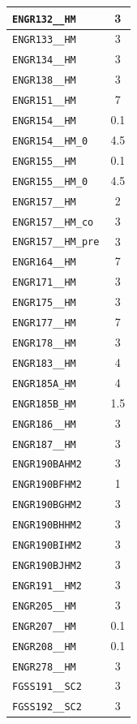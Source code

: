 \begin{longtable}{|p{}|c|}
    \verb|ENGR132__HM| & 3\\\hline
    \verb|ENGR133__HM| & 3\\\hline
    \verb|ENGR134__HM| & 3\\\hline
    \verb|ENGR138__HM| & 3\\\hline
    \verb|ENGR151__HM| & 7\\\hline
    \verb|ENGR154__HM| & 0.1\\\hline
    \verb|ENGR154__HM_0| & 4.5\\\hline
    \verb|ENGR155__HM| & 0.1\\\hline
    \verb|ENGR155__HM_0| & 4.5\\\hline
    \verb|ENGR157__HM| & 2\\\hline
    \verb|ENGR157__HM_co| & 3\\\hline
    \verb|ENGR157__HM_pre| & 3\\\hline
    \verb|ENGR164__HM| & 7\\\hline
    \verb|ENGR171__HM| & 3\\\hline
    \verb|ENGR175__HM| & 3\\\hline
    \verb|ENGR177__HM| & 7\\\hline
    \verb|ENGR178__HM| & 3\\\hline
    \verb|ENGR183__HM| & 4\\\hline
    \verb|ENGR185A_HM| & 4\\\hline
    \verb|ENGR185B_HM| & 1.5\\\hline
    \verb|ENGR186__HM| & 3\\\hline
    \verb|ENGR187__HM| & 3\\\hline
    \verb|ENGR190BAHM2| & 3\\\hline
    \verb|ENGR190BFHM2| & 1\\\hline
    \verb|ENGR190BGHM2| & 3\\\hline
    \verb|ENGR190BHHM2| & 3\\\hline
    \verb|ENGR190BIHM2| & 3\\\hline
    \verb|ENGR190BJHM2| & 3\\\hline
    \verb|ENGR191__HM2| & 3\\\hline
    \verb|ENGR205__HM| & 3\\\hline
    \verb|ENGR207__HM| & 0.1\\\hline
    \verb|ENGR208__HM| & 0.1\\\hline
    \verb|ENGR278__HM| & 3\\\hline
    \verb|FGSS191__SC2| & 3\\\hline
    \verb|FGSS192__SC2| & 3\\\hline

\end{longtable}
